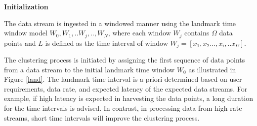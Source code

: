 



\vspace{7mm}
\hspace{-1 cm}
\textbf{Initialization}

The data stream is ingested in a windowed manner using the landmark time window model $W_0, W_1, ..W_j, ..,W_N $, where each window $W_j$ contains $\Omega$ data points and $L$ is defined as the time interval of window $W_j = [x_1,x_2...,x_i,..x_{\Omega}]$.





The clustering process is initiated by assigning the first sequence of data points from a data stream to the initial landmark time window $W_0$ as illustrated in Figure \ref{land}. The landmark time interval is a-priori determined based on user requirements, data rate, and expected latency of the expected data streams. For example, if high latency is expected in harvesting the data points, a long duration for the time intervals is advised. In contrast, in processing data from high rate streams, short time intervals will improve the clustering process. 


